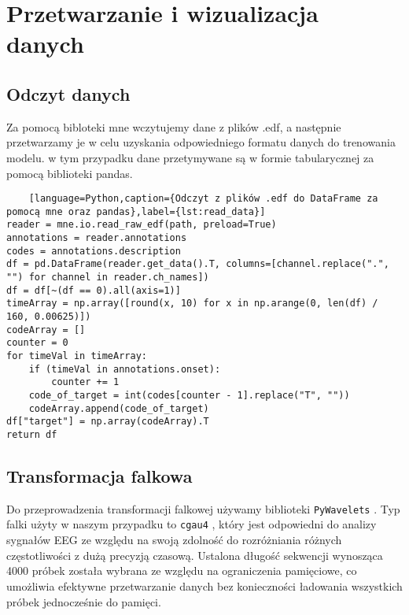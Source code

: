 \documentclass[12pt,twoside]{article}
\begin{document}
    \section{Przetwarzanie i wizualizacja danych}

    \subsection{Odczyt danych}
    Za pomocą bibloteki mne wczytujemy dane z plików .edf, a następnie przetwarzamy je w celu uzyskania odpowiedniego
    formatu danych do trenowania modelu. w tym przypadku dane przetymywane są w formie tabularycznej za pomocą
    biblioteki pandas.

    \begin{lstlisting}
    [language=Python,caption={Odczyt z plików .edf do DataFrame za pomocą mne oraz pandas},label={lst:read_data}]
reader = mne.io.read_raw_edf(path, preload=True)
annotations = reader.annotations  
codes = annotations.description  
df = pd.DataFrame(reader.get_data().T, columns=[channel.replace(".", "") for channel in reader.ch_names])  
df = df[~(df == 0).all(axis=1)] 
timeArray = np.array([round(x, 10) for x in np.arange(0, len(df) / 160, 0.00625)])
codeArray = []
counter = 0
for timeVal in timeArray:
    if (timeVal in annotations.onset):
        counter += 1
    code_of_target = int(codes[counter - 1].replace("T", ""))
    codeArray.append(code_of_target)
df["target"] = np.array(codeArray).T
return df
    \end{lstlisting}

    \subsection{Transformacja falkowa}
    Do przeprowadzenia transformacji falkowej używamy biblioteki \texttt{PyWavelets}
    . Typ falki użyty w naszym przypadku to \texttt{cgau4}
    , który jest odpowiedni do analizy sygnałów EEG ze względu na swoją zdolność do rozróżniania różnych częstotliwości
    z dużą precyzją czasową. Ustalona długość sekwencji wynosząca 4000 próbek została wybrana ze względu na ograniczenia
    pamięciowe, co umożliwia efektywne przetwarzanie danych bez konieczności ładowania wszystkich próbek jednocześnie do
    pamięci.
\end{document}
